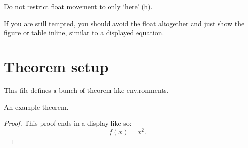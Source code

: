 \begin{Rule}
  Do not restrict float movement to only `here'
  \textnormal{(\lstinline-h-)}.
\end{Rule}

If you are still tempted, you should avoid the float altogether and
just show the figure or table inline, similar to a displayed equation.

\section*{Theorem setup}

This file defines a bunch of theorem-like environments.

\begin{theorem}
  An example theorem.
\end{theorem}

\begin{proof}
  This proof ends in a display like so:
  \begin{displaymath}
    f(x) = x^2.
  \end{displaymath}
\end{proof}

